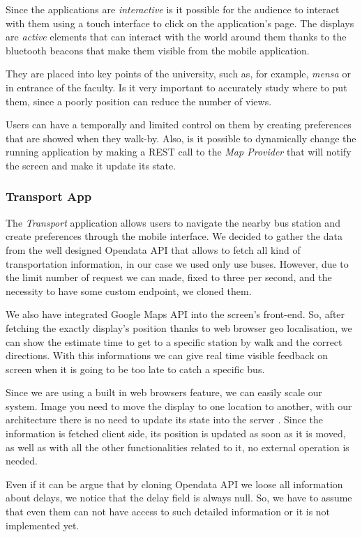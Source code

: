 \documentclass[]{usiinfbachelorproject}
\begin{document}
 Since the applications are \emph{interactive} is it possible for the audience to interact with them using a touch interface to click on the application's page. The displays are \emph{active} elements that can interact with the world around them thanks to the bluetooth beacons that make them visible from the mobile application.
 
They are placed into key points of the university, such as, for example, \emph{mensa} or in entrance of the faculty. Is it very important to accurately study where to put them, since a poorly position can reduce the number of views.

Users can have a temporally and limited control on them by creating preferences that are showed when they walk-by.
Also, is it possible to dynamically change the running application by making a REST call to the \emph{Map Provider} that will notify the screen and make it update its state.


\subsubsection{Transport App}
The \emph{Transport} application allows users to navigate the nearby bus station and create preferences through the mobile interface. We decided to gather the data from the well designed Opendata API that allows to fetch all kind of transportation information, in our case we used only use buses.
However, due to the limit number of request we can made, fixed to three per second, and the necessity to have some custom endpoint, we cloned them.

We also have integrated Google Maps API into the screen's front-end. So, after fetching the exactly display's position thanks to web browser geo localisation, we can show the estimate time to get to a specific station by walk and the correct directions. With this informations we can give real time visible feedback on screen when it is going to be too late to catch a specific bus.

Since we are using a built in web browsers feature, we can easily scale our system. Image you need to move the display to one location to another, with our architecture there is no need to update its state into the server . Since the information is fetched client side, its position is updated as soon as it is moved, as well as with all the other functionalities related to it,  no external operation is needed.

Even if it can be argue that by cloning Opendata API we loose all information about delays, we notice that the delay field is always null. So, we have to assume that even them can not have access to such detailed information or it is not implemented yet.
\end{document}
